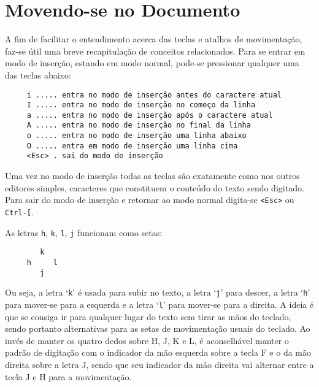 
\chapter{Movendo-se no Documento}
\label{cha:Movendo-se no Documento}

A fim de facilitar o entendimento acerca das teclas e atalhos de movimentação,
faz-se útil uma breve recapitulação de conceitos relacionados. Para se entrar
em modo de inserção, estando em modo normal, pode-se pressionar qualquer uma
das teclas abaixo:

\begin{verbatim}
     i ..... entra no modo de inserção antes do caractere atual
     I ..... entra no modo de inserção no começo da linha
     a ..... entra no modo de inserção após o caractere atual
     A ..... entra no modo de inserção no final da linha
     o ..... entra no modo de inserção uma linha abaixo
     O ..... entra em modo de inserção uma linha cima
     <Esc> . sai do modo de inserção
\end{verbatim}

Uma vez no modo de inserção todas as teclas são exatamente como nos
outros editores simples, caracteres que constituem o conteúdo do texto sendo
digitado.  Para sair do modo de inserção e retornar ao modo normal digita-se
\verb+<Esc>+ ou \verb+Ctrl-[+.

As letras {\tt h}, {\tt k}, {\tt l}, {\tt j} funcionam como setas:

\begin{verbatim}
        k
     h     l
        j
\end{verbatim}

Ou seja, a letra `{\tt k}' é usada para subir no texto, a letra `{\tt j}' para descer,
a letra `{\tt h}' para mover-se para a esquerda e a letra `{\tt l}' para mover-se para
a direita. A ideia é que se consiga ir para qualquer lugar do texto sem tirar
as mãos do teclado, sendo portanto alternativas para as setas de movimentação
usuais do teclado. Ao invés de manter os quatro dedos sobre H, J, K e L, é aconselhável 
manter o padrão de digitação com o indicador da mão esquerda sobre a tecla F e o da mão
direita sobre a letra J, sendo que seu indicador da mão direita vai alternar entre a
tecla J e H para a movimentação.

